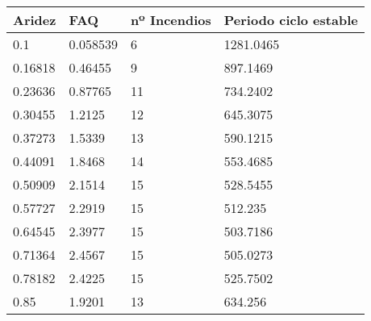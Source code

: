 \begin{tabular}{llll}
Aridez & FAQ & nº Incendios & Periodo ciclo estable \\ 
\hline 
0.1 & 0.058539 & 6 & 1281.0465 \\ 
0.16818 & 0.46455 & 9 & 897.1469 \\ 
0.23636 & 0.87765 & 11 & 734.2402 \\ 
0.30455 & 1.2125 & 12 & 645.3075 \\ 
0.37273 & 1.5339 & 13 & 590.1215 \\ 
0.44091 & 1.8468 & 14 & 553.4685 \\ 
0.50909 & 2.1514 & 15 & 528.5455 \\ 
0.57727 & 2.2919 & 15 & 512.235 \\ 
0.64545 & 2.3977 & 15 & 503.7186 \\ 
0.71364 & 2.4567 & 15 & 505.0273 \\ 
0.78182 & 2.4225 & 15 & 525.7502 \\ 
0.85 & 1.9201 & 13 & 634.256 \\ 
\hline 
\end{tabular}